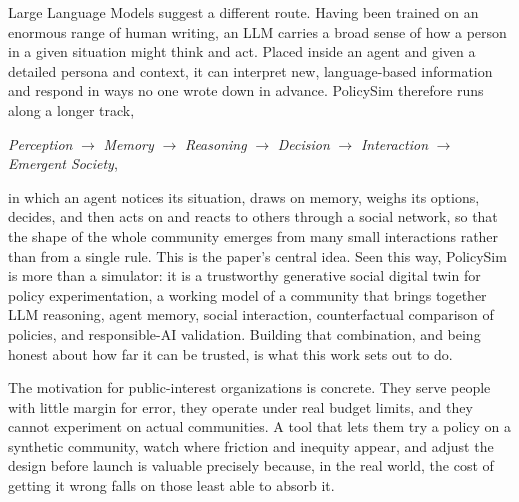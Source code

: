 \documentclass[conference]{IEEEtran}
\begin{document}
Large Language Models suggest a different route. Having been trained on an enormous range of human writing, an LLM carries a broad sense of how a person in a given situation might think and act. Placed inside an agent and given a detailed persona and context, it can interpret new, language-based information and respond in ways no one wrote down in advance. PolicySim therefore runs along a longer track,
\begin{center}
\textit{Perception} $\rightarrow$ \textit{Memory} $\rightarrow$ \textit{Reasoning} $\rightarrow$ \textit{Decision} $\rightarrow$ \textit{Interaction} $\rightarrow$ \textit{Emergent Society},
\end{center}
in which an agent notices its situation, draws on memory, weighs its options, decides, and then acts on and reacts to others through a social network, so that the shape of the whole community emerges from many small interactions rather than from a single rule. This is the paper's central idea. Seen this way, PolicySim is more than a simulator: it is a trustworthy generative social digital twin for policy experimentation, a working model of a community that brings together LLM reasoning, agent memory, social interaction, counterfactual comparison of policies, and responsible-AI validation. Building that combination, and being honest about how far it can be trusted, is what this work sets out to do.

The motivation for public-interest organizations is concrete. They serve people with little margin for error, they operate under real budget limits, and they cannot experiment on actual communities. A tool that lets them try a policy on a synthetic community, watch where friction and inequity appear, and adjust the design before launch is valuable precisely because, in the real world, the cost of getting it wrong falls on those least able to absorb it.
\end{document}
